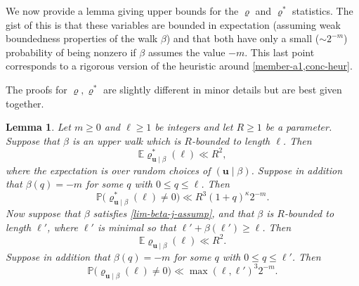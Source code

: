 \documentclass[11pt,reqno]{amsart}
\numberwithin{equation}{section}
\newtheorem{lemma}[theorem]{Lemma}
\theoremstyle{definition}
\theoremstyle{remark}
\newcommand{\mb}{\mathbb}
\newcommand{\mbf}{\mathbf}
\renewcommand{\le}{\leqslant}
\renewcommand{\ge}{\geqslant}
\begin{document}
We now provide a lemma giving upper bounds for the $\varrho$ and $\varrho^*$ statistics. The gist of this is that these variables are bounded in expectation (assuming weak boundedness properties of the walk $\beta$) and that both have only a small ($\sim 2^{-m}$) probability of being nonzero if $\beta$ assumes the value $-m$. This last point corresponds to a rigorous version of the heuristic around \cref{member-a1,conc-heur}.

The proofs for $\varrho, \varrho^*$ are slightly different in minor details but are best given together.

\begin{lemma}\label{X-upper-gen} 
Let $m \ge 0$ and $\ell \ge 1$ be integers and let $R \ge 1$ be a parameter. Suppose that $\beta$ is an upper walk which is $R$-bounded to length $\ell$.  Then 
\begin{equation}\label{X-upper-simple} \mb{E} \varrho^*_{\mbf{u} \mid \beta}(\ell) \ll R^2,\end{equation} where the expectation is over random choices of $(\mbf{u} \mid \beta)$. Suppose in addition that $\beta(q) = -m$ for some $q$ with $0 \le q \le \ell$. Then 
\begin{equation}\label{X-non-vanishing} \mb{P}\big(\varrho^*_{\mbf{u} \mid \beta}(\ell) \ne 0\big) \ll R^3 (1 + q)^{\kappa} 2^{-m}.\end{equation}
Now suppose that $\beta$ satisfies \cref{lim-beta-j-assump}, and that $\beta$ is $R$-bounded to length $\ell'$, where $\ell'$ is minimal so that $\ell' + \beta(\ell') \ge \ell$. Then 
\begin{equation}\label{rho-moment-bd} \mb{E} \varrho_{\mbf{u} \mid \beta}(\ell) \ll R^{2}.\end{equation}
Suppose in addition that $\beta(q) = -m$ for some $q$ with $0 \le q \le \ell'$. Then \begin{equation}\label{rho-nonvanishing-bd} \mb{P}\big(\varrho_{\mbf{u} \mid \beta}(\ell) \ne 0\big) \ll \max(\ell, \ell')^{3} 2^{-m}.\end{equation} 
\end{lemma}
\end{document}
